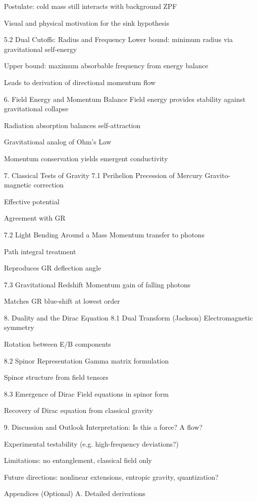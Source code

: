 \documentclass {article}
\begin{document}
Postulate: cold mass still interacts with background ZPF

Visual and physical motivation for the sink hypothesis

5.2 Dual Cutoffs: Radius and Frequency
Lower bound: minimum radius via gravitational self-energy

Upper bound: maximum absorbable frequency from energy balance

Leads to derivation of directional momentum flow

6. Field Energy and Momentum Balance
Field energy provides stability against gravitational collapse

Radiation absorption balances self-attraction

Gravitational analog of Ohm’s Law

Momentum conservation yields emergent conductivity

7. Classical Tests of Gravity
7.1 Perihelion Precession of Mercury
Gravito-magnetic correction

Effective potential

Agreement with GR

7.2 Light Bending Around a Mass
Momentum transfer to photons

Path integral treatment

Reproduces GR deflection angle

7.3 Gravitational Redshift
Momentum gain of falling photons

Matches GR blue-shift at lowest order

8. Duality and the Dirac Equation
8.1 Dual Transform (Jackson)
Electromagnetic symmetry

Rotation between E/B components

8.2 Spinor Representation
Gamma matrix formulation

Spinor structure from field tensors

8.3 Emergence of Dirac
Field equations in spinor form

Recovery of Dirac equation from classical gravity

9. Discussion and Outlook
Interpretation: Is this a force? A flow?

Experimental testability (e.g. high-frequency deviations?)

Limitations: no entanglement, classical field only

Future directions: nonlinear extensions, entropic gravity, quantization?

Appendices (Optional)
A. Detailed derivations
\end{document}
